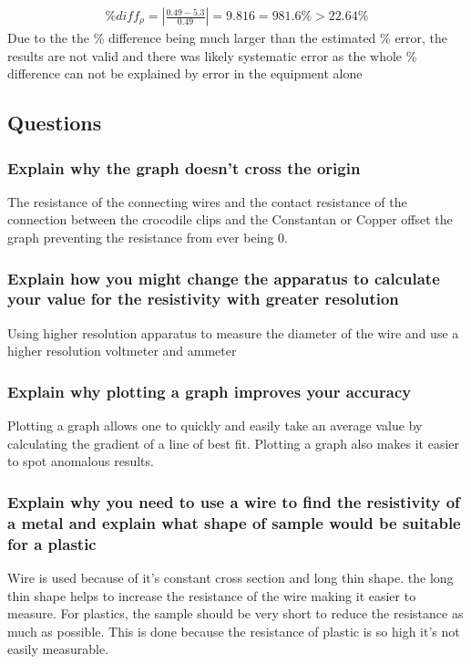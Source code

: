 \documentclass{article}
\begin{document}
\begin{gather}
	\%diff_{\rho} = \left | \frac{0.49 - 5.3}{0.49} \right | = 9.816 = 981.6\% > 22.64\%
\end{gather}
Due to the the \% difference being much larger than the estimated \% error, the
results are not valid and there was likely systematic error as the whole \%
difference can not be explained by error in the equipment alone

\subsection{Questions}

\subsubsection{Explain why the graph doesn't cross the origin}
The resistance of the connecting wires and the contact resistance
of the connection between the crocodile clips and the Constantan or
Copper offset the graph preventing the resistance from ever being 0.

\subsubsection{Explain how you might change the apparatus to calculate your value for the resistivity with greater resolution}
Using higher resolution apparatus to measure the diameter of the wire and use
a higher resolution voltmeter and ammeter

\subsubsection{Explain why plotting a graph improves your accuracy}
Plotting a graph allows one to quickly and easily take an average value
by calculating the gradient of a line of best fit. Plotting a graph
also makes it easier to spot anomalous results.

\subsubsection{Explain why you need to use a wire to find the resistivity of a metal and explain what shape of sample would be suitable for a plastic}
Wire is used because of it's constant cross section and long thin shape.
the long thin shape helps to increase the resistance of the wire making it
easier to measure. For plastics, the sample should be very short to reduce
the resistance as much as possible. This is done because the resistance of
plastic is so high it's not easily measurable.
\end{document}
